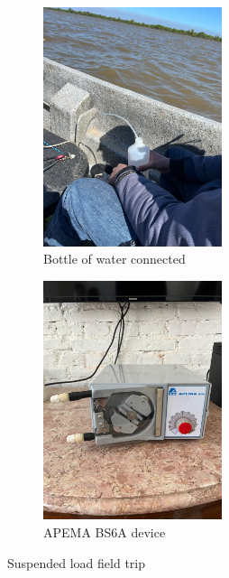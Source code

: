 \begin{figure}[H]
    \begin{subfigure}[c]{0.48\textwidth}
        \includegraphics[width=\linewidth, height=7cm]{figures/ch4/fles.jpg}
        \caption{Bottle of water connected}
        
    \end{subfigure}
    \hfill
    \begin{subfigure}[d]{0.48\textwidth}
        \includegraphics[width=\linewidth, height=7cm]{figures/ch4/APEMA BS6A.jpg}
        \caption{APEMA BS6A device}
    \end{subfigure}

    \caption{Suspended load field trip}
    \label{fig:suspended sediment}
\end{figure}




